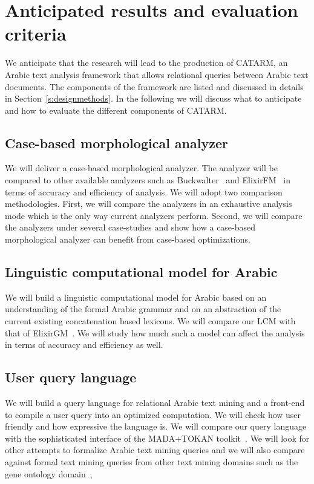 \documentclass[12pt]{article}
\begin{document}
\section{Anticipated results and evaluation criteria}
\label{s:results}

We anticipate that the research will lead to the production of 
CATARM, an Arabic text analysis framework that allows relational 
queries between Arabic text documents.
The components of the framework are listed and discussed
in details in Section~\ref{s:designmethods}.
In the following we will discuss what to anticipate and 
how to evaluate the different components of CATARM. 

\subsection{Case-based morphological analyzer} 

We will deliver a case-based morphological analyzer. 
The analyzer will be compared to other available analyzers such as
Buckwalter~\cite{Tim04} and ElixirFM~\cite{Otakar:07} in terms
of accuracy and efficiency of analysis.
We will adopt two comparison methodologies. 
First, we will compare the analyzers in an exhaustive analysis mode
which is the only way current analyzers perform. 
Second, we will compare the analyzers under several case-studies
and show how a case-based morphological analyzer can benefit
from case-based optimizations.

\subsection{Linguistic computational model for Arabic}

We will build a linguistic computational model for Arabic 
based on an understanding of the formal Arabic grammar 
and on an abstraction of the current existing concatenation
based lexicons.
We will compare our LCM with that of ElixirGM~\cite{Otakar:07}.
We will study how much such a model can affect the analysis
in terms of accuracy and efficiency as well. 

\subsection{User query language}

We will build a query language for relational Arabic text mining 
and a front-end to compile a user query into an optimized
computation. 
We will check how user friendly and how expressive the language is.
We will compare our query language with the sophisticated 
interface of the MADA+TOKAN toolkit~\cite{Habash:09}.
We will look for other attempts to formalize Arabic text 
mining queries and we will also compare against 
formal text mining queries from other text mining domains such
as the gene ontology domain~\cite{GeneOntology10},
\end{document}
